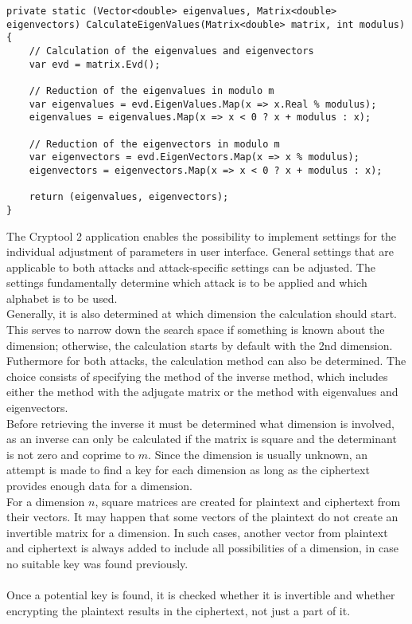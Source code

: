 \documentclass[conference]{IEEEtran}
\begin{document}
\begin{lstlisting}[caption={CalculateEigenValues method}, label={lst:calcEigenVal}]
private static (Vector<double> eigenvalues, Matrix<double> eigenvectors) CalculateEigenValues(Matrix<double> matrix, int modulus)
{
    // Calculation of the eigenvalues and eigenvectors
    var evd = matrix.Evd();

    // Reduction of the eigenvalues in modulo m
    var eigenvalues = evd.EigenValues.Map(x => x.Real % modulus);
    eigenvalues = eigenvalues.Map(x => x < 0 ? x + modulus : x);

    // Reduction of the eigenvectors in modulo m
    var eigenvectors = evd.EigenVectors.Map(x => x % modulus);
    eigenvectors = eigenvectors.Map(x => x < 0 ? x + modulus : x);

    return (eigenvalues, eigenvectors);
}
\end{lstlisting}

The Cryptool 2 application enables the possibility to implement settings for the individual adjustment of parameters in user interface. General settings that are applicable to both attacks and attack-specific settings can be adjusted. The settings fundamentally determine which attack is to be applied and which alphabet is to be used.
\\
Generally, it is also determined at which dimension the calculation should start. This serves to narrow down the search space if something is known about the dimension; otherwise, the calculation starts by default with the 2nd dimension.
Futhermore for both attacks, the calculation method can also be determined. The choice consists of specifying the method of the inverse method, which includes either the method with the adjugate matrix or the method with eigenvalues and eigenvectors.
\\
Before retrieving the inverse it must be determined what dimension is involved, as an inverse can only be calculated if the matrix is square and the determinant is not zero and coprime to \(m\). Since the dimension is usually unknown, an attempt is made to find a key for each dimension as long as the ciphertext provides enough data for a dimension.
\\
For a dimension \(n\), square matrices are created for plaintext and ciphertext from their vectors. It may happen that some vectors of the plaintext do not create an invertible matrix for a dimension. In such cases, another vector from plaintext and ciphertext is always added to include all possibilities of a dimension, in case no suitable key was found previously.
\\\\
Once a potential key is found, it is checked whether it is invertible and whether encrypting the plaintext results in the ciphertext, not just a part of it.\\
\end{document}
